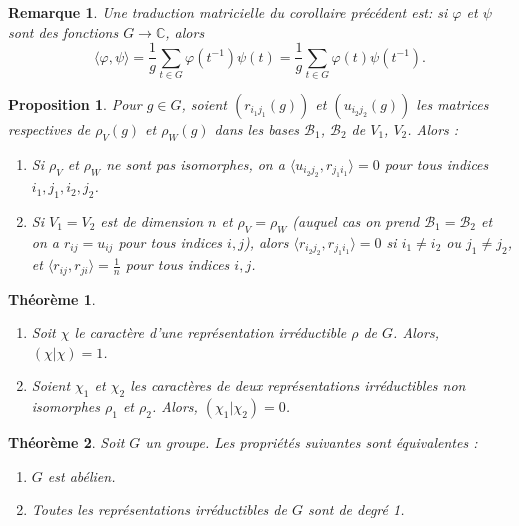 \documentclass[9pt]{beamer}
\newtheorem{proposition}{Proposition}
\newtheorem{remark}{Remarque}
\newtheorem{theoreme}{Théorème}
\begin{document}
\begin{frame}
\begin{remark} 
	Une traduction matricielle du corollaire précédent est: 
	si \( \varphi \) et \( \psi \) sont des fonctions \( G \to \mathbb{C} \), alors
	\[
	\langle \varphi, \psi \rangle = \frac{1}{g} \sum_{t \in G} \varphi(t^{-1})\psi(t) 
	= \frac{1}{g} \sum_{t \in G} \varphi(t)\psi(t^{-1}). \tag{1}
	\]
\end{remark}

\begin{proposition} 
	Pour \( g \in G \), soient \( (r_{i_1 j_1}(g)) \) et \( (u_{i_2 j_2}(g)) \) les matrices respectives de \( \rho_V(g) \) et \( \rho_W(g) \) dans les bases \( \mathcal{B}_1 \), \( \mathcal{B}_2 \) de \( V_1 \), \( V_2 \). Alors :
	\begin{enumerate}[label=\roman*)]
		\item Si \( \rho_V \) et \( \rho_W \) ne sont pas isomorphes, on a \( \langle u_{i_2 j_2}, r_{j_1 i_1} \rangle = 0 \) pour tous indices \( i_1, j_1, i_2, j_2 \).
		\item Si \( V_1 = V_2 \) est de dimension \( n \) et \( \rho_V = \rho_W \) (auquel cas on prend \( \mathcal{B}_1 = \mathcal{B}_2 \) et on a \( r_{ij} = u_{ij} \) pour tous indices \( i, j \)), alors \( \langle r_{i_2 j_2}, r_{j_1 i_1} \rangle = 0 \) si \( i_1 \neq i_2 \) ou \( j_1 \neq j_2 \), et \( \langle r_{ij}, r_{ji} \rangle = \frac{1}{n} \) pour tous indices \( i, j \).
	\end{enumerate}
\end{proposition}


\end{frame}


\begin{frame}
	\begin{theoreme}
		\begin{enumerate}[label=\roman*)]
			\item Soit \( \chi \) le caractère d’une représentation irréductible \( \rho \) de \( G \). Alors, \( (\chi | \chi) = 1 \).
			\item Soient \( \chi_1 \) et \( \chi_2 \) les caractères de deux représentations irréductibles non isomorphes \( \rho_1 \) et \( \rho_2 \). Alors, \( (\chi_1 | \chi_2) = 0 \).
		\end{enumerate}
	\end{theoreme}

\begin{theoreme}  
	Soit \( G \) un groupe. Les propriétés suivantes sont équivalentes :
	\begin{enumerate}
		\item[(i)] \( G \) est abélien.
		\item[(ii)] Toutes les représentations irréductibles de \( G \) sont de degré 1.
	\end{enumerate}
\end{theoreme}
\end{frame}
\end{document}
